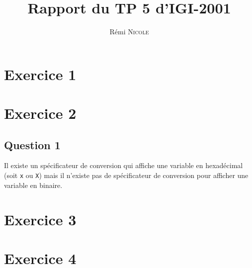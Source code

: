 \documentclass{report}
\author{Rémi \textsc{Nicole}}
\title{Rapport du TP 5 d'IGI-2001}
\date{}
\begin{document}
\maketitle

\chapter{Exercice 1}



\chapter{Exercice 2}



\section{Question 1}
Il existe un spécificateur de conversion qui affiche une variable en hexadécimal
(soit \texttt{x} ou \texttt{X}) mais il n'existe pas de spécificateur de conversion pour
afficher une variable en binaire.

\chapter{Exercice 3}



\chapter{Exercice 4}


\end{document}
